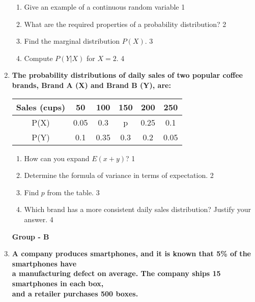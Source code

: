 \documentclass{article}
\begin{document}
\begin{enumerate}
  \begin{enumerate}
  \item Give an example of a continuous random variable \hfill 1
  \item What are the required properties of a probability distribution? \hfill 2
    \item
    	Find the marginal distribution \( P(X) \). \hfill 3
    \item
     	Compute \( P(Y \vert X) \) for \( X = 2 \). \hfill 4
  \end{enumerate}
  
    \item
	  \textbf{The probability distributions of daily sales of two popular coffee brands, Brand A (X) and Brand B (Y), are:} 
	  
	    \begin{table}[h]
	    	  \begin{center}
\begin{tabular}{c|c|c|c|c|c}
Sales (cups) & 50   & 100  & 150  & 200  & 250  \\ \hline
P(X)         & 0.05 & 0.3  & p    & 0.25 & 0.1  \\ \hline
P(Y)         & 0.1  & 0.35 & 0.3  & 0.2  & 0.05
\end{tabular}
	  \end{center}
\end{table}
  
  \begin{enumerate}
  \item How can you expand $E(x+y)$? \hfill 1
  
  \item Determine the formula of variance in terms of expectation. \hfill 2
       \item  
	Find \( p \) from the table. \hfill 3
    \item
	Which brand has a more consistent daily sales distribution? Justify your answer. \hfill 4
  \end{enumerate}
  
  \begin{center}
\textbf{Group  - B}
\end{center}
  
    \item
	  \textbf{A company produces smartphones, and it is known that 5\% of the 
	  smartphones have \\ a manufacturing defect on average. The company ships 15 
	  smartphones in each box, \\ and a retailer purchases 500 boxes.} 
  

\end{enumerate}
\end{document}
